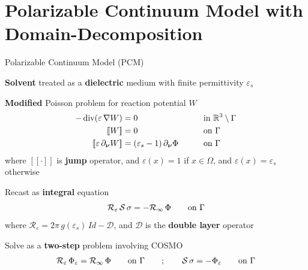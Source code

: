 \section{\bf Polarizable Continuum Model with Domain-Decomposition}
\begin{frame}{Polarizable Continuum Model (PCM)}

\begin{wideitemize}

\item {\bf Solvent} treated as a {\bf dielectric} medium with finite permittivity $\varepsilon_s$ 

\item {\bf Modified} Poisson problem for {reaction potential} $W$
\begin{alignat*}{3}
- \dive ( \varepsilon \, \nabla W ) &= 0 &&\text{in } \mathbb{R}^3 \setminus \Gamma \displaybump \\
[\![W ]\!]&=0 \qquad &&\text{on }\Gamma \\
[\![ \varepsilon \, \partial_{\bnu} W ]\!] &=(\varepsilon_s - 1 ) \, \partial_{\bnu} \Phi \qquad &&\text{on }\Gamma
\end{alignat*}
where $[\![ \cdot ]\!]$ is {\bf jump} operator, and $\varepsilon(x) = 1$ if $x \in \Omega$, and $\varepsilon(x) = \varepsilon_s$ otherwise

\item Recast as {\bf integral} equation
\[
\mathcal{R}_\varepsilon \, \mathcal{S} \, \sigma = -\mathcal{R}_\infty \, \Phi \qquad \text{on }\Gamma \displaybump
\]
where $\mathcal{R}_\varepsilon = 2\pi \,g(\varepsilon_s) \, Id - \mathcal{D}$, and $\mathcal{D}$ is the {\bf double layer} operator
\item Solve as a {\bf two-step} problem involving {COSMO}
\[
\mathcal{R}_\varepsilon \, \Phi_\varepsilon =  \mathcal{R}_\infty \, \Phi \qquad \text{on } \Gamma \qquad ; \qquad
\mathcal{S} \, \sigma =  -\Phi_\varepsilon \qquad \text{on } \Gamma \displaybump
\]

\end{wideitemize}

\end{frame}

